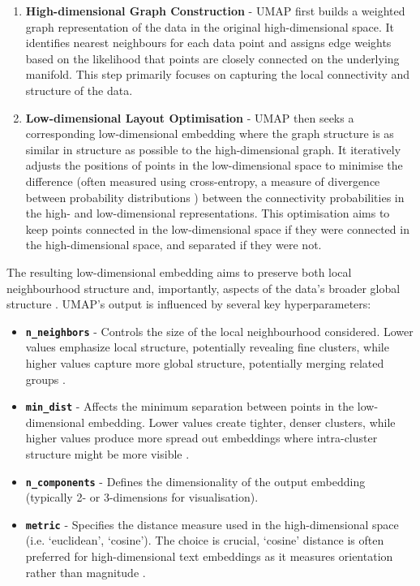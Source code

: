 \documentclass[10pt,oneside]{report}
\begin{document}
\begin{enumerate}
    \item \textbf{High-dimensional Graph Construction} - UMAP first builds a weighted graph representation of the data in the original high-dimensional space. It identifies nearest neighbours for each data point and assigns edge weights based on the likelihood that points are closely connected on the underlying manifold. This step primarily focuses on capturing the local connectivity and structure of the data.
    \item \textbf{Low-dimensional Layout Optimisation} - UMAP then seeks a corresponding low-dimensional embedding where the graph structure is as similar in structure as possible to the high-dimensional graph. It iteratively adjusts the positions of points in the low-dimensional space to minimise the difference (often measured using cross-entropy, a measure of divergence between probability distributions \cite{zhang2018generalized}) between the connectivity probabilities in the high- and low-dimensional representations. This optimisation aims to keep points connected in the low-dimensional space if they were connected in the high-dimensional space, and separated if they were not.
\end{enumerate}

The resulting low-dimensional embedding aims to preserve both local neighbourhood structure and, importantly, aspects of the data's broader global structure \cite{mcinnes2018umap}. UMAP's output is influenced by several key hyperparameters:
\begin{itemize}
    \item \textbf{\texttt{n\_neighbors}} - Controls the size of the local neighbourhood considered. Lower values emphasize local structure, potentially revealing fine clusters, while higher values capture more global structure, potentially merging related groups \cite{mcinnes2018umap}.
    \item \textbf{\texttt{min\_dist}} - Affects the minimum separation between points in the low-dimensional embedding. Lower values create tighter, denser clusters, while higher values produce more spread out embeddings where intra-cluster structure might be more visible \cite{mcinnes2018umap}.
    \item \textbf{\texttt{n\_components}} - Defines the dimensionality of the output embedding (typically 2- or 3-dimensions for visualisation).
    \item \textbf{\texttt{metric}} - Specifies the distance measure used in the high-dimensional space (i.e. `euclidean', `cosine'). The choice is crucial, `cosine' distance is often preferred for high-dimensional text embeddings as it measures orientation rather than magnitude \cite{mcinnes2018umap}.
\end{itemize}
\end{document}
